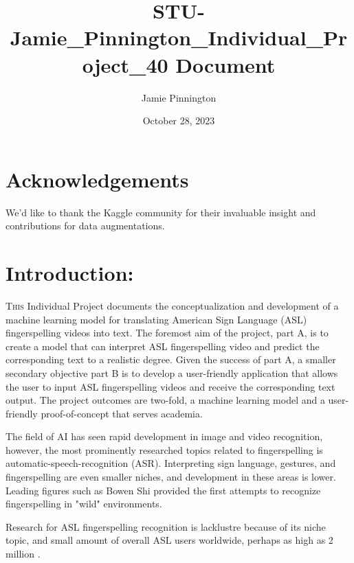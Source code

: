\documentclass[preprint,11pt,review,authoryear]{elsarticle}
\title{STU-Jamie_Pinnington_Individual_Project_40 Document}
\author{Jamie Pinnington}
\date{October 28, 2023}
\begin{document}
\pagestyle{customStyle} %



\clearpage %

\begin{abstract}
\end{abstract}

\section{Acknowledgements}

We'd like to thank the Kaggle community for their invaluable insight and contributions for data augmentations.

\clearpage %

\tableofcontents
\clearpage %

\listoffigures
\clearpage %

\listoftables
\clearpage %

\section{Introduction:}

\lettrine[lines=2]{T}{his} Individual Project documents the conceptualization and development of a machine learning model for translating American Sign Language (ASL) fingerspelling videos into text. The foremost aim of the project, part A, is to create a model that can interpret ASL fingerspelling video and predict the corresponding text to a realistic degree. Given the success of part A, a smaller secondary objective part B is to develop a user-friendly application that allows the user to input ASL fingerspelling videos and receive the corresponding text output. The project outcomes are two-fold, a machine learning model and a user-friendly proof-of-concept that serves academia.

The field of AI has seen rapid development in image and video recognition, however, the most prominently researched topics related to fingerspelling is automatic-speech-recognition (ASR). Interpreting sign language, gestures, and fingerspelling are even smaller niches, and development in these areas is lower. Leading figures such as Bowen Shi \citep{shiFingerspellingDetectionAmerican2021} provided the first attempts to recognize fingerspelling in "wild" environments.

Research for ASL fingerspelling recognition is lacklustre because of its niche topic, and small amount of overall ASL users worldwide, perhaps as high as 2 million \citep{mitchellHowManyPeople2006, ethnologueAmericanSignLanguage2023}. 
\end{document}
